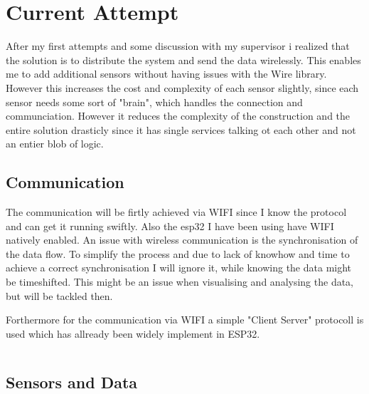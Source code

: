 \chapter*{Current Attempt}
\label{chap:Technical CHallenges}
\renewcommand{\thesection}{\arabic{section}}
\setcounter{section}{0}

After my first attempts and some discussion with my supervisor i realized that the solution is to distribute the system and send the data wirelessly. This enables me to add additional sensors without having issues with the Wire library. However this increases the cost and complexity of each sensor slightly, since each sensor needs some sort of "brain", which handles the connection and communciation. 
However it reduces the complexity of the construction and the entire solution drasticly since it has single services talking ot each other and not an entier blob of logic. 

\section{Communication}

The communication will be firtly achieved via WIFI since I know the protocol and can get it running swiftly. Also the esp32 I have been using have WIFI natively enabled. 
An issue with wireless communication is the synchronisation of the data flow. To simplify the process and due to lack of knowhow and time to achieve a correct synchronisation I will ignore it, while knowing the data might be timeshifted. 
This might be an issue when visualising and analysing the data, but will be tackled then.

Forthermore for the communication via WIFI a simple "Client Server" protocoll is used which has allready been widely implement in ESP32.

\begin{lstlisting}

\end{lstlisting}

\section{Sensors and Data}




